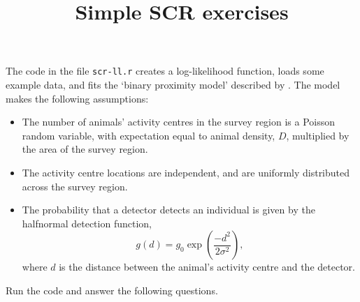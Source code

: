 \documentclass{article}
\title{Simple SCR exercises}
\date{}
\begin{document}
\maketitle

The code in the file \texttt{scr-ll.r} creates a log-likelihood
function, loads some example data, and fits the `binary proximity
model' described by . The model makes the following
assumptions:
\begin{itemize}
\item The number of animals' activity centres in the survey region is
  a Poisson random variable, with expectation equal to animal density,
  $D$, multiplied by the area of the survey region.
\item The activity centre locations are independent, and are uniformly
  distributed across the survey region.
\item The probability that a detector detects an individual is given
  by the halfnormal detection function,
  \begin{equation*}
    g(d) = g_0 \exp\left( \frac{-d^2}{2\sigma^2} \right),
  \end{equation*}
  where $d$ is the distance between the animal's activity centre and
  the detector.
\end{itemize}

Run the code and answer the following questions.
\end{document}
